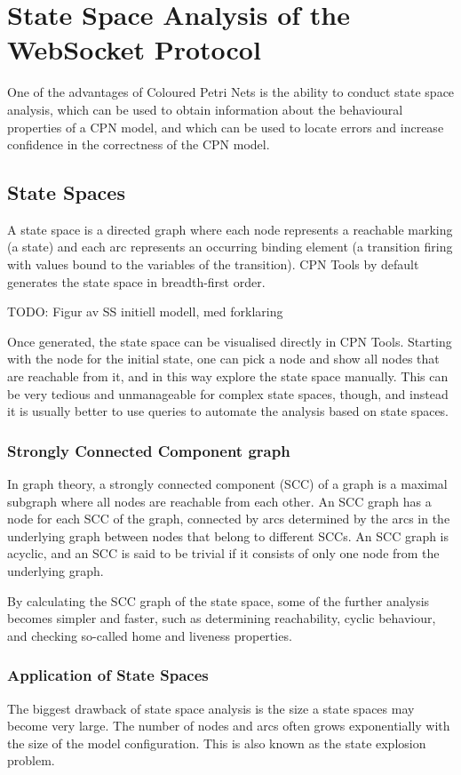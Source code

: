 \chapter{State Space Analysis of the WebSocket Protocol}
\label{chap:statespace}

One of the advantages of Coloured Petri Nets is the ability to conduct state
space analysis, which can be used to obtain information about the
behavioural properties of a CPN model, and which can be used to locate errors
and increase confidence in the correctness of the CPN model.

\section{State Spaces}
A state space is a directed graph where each node represents a reachable marking
(a state) and each arc represents an occurring binding element (a transition
firing with values bound to the variables of the transition). CPN Tools
by default generates the state space in breadth-first order. 

TODO: Figur av SS initiell modell, med forklaring

Once generated, the state space can be visualised directly in CPN Tools.
Starting with the node for the initial state, one can pick a node and show all
nodes that are reachable from it, and in this way explore the state space
manually. This can be very tedious and unmanageable for complex state spaces,
though, and instead it is usually better to use queries to automate the analysis
based on state spaces.

	\subsection{Strongly Connected Component graph}
	In graph theory, a strongly connected component (SCC) of a graph is a maximal
	subgraph where all nodes are reachable from each other. An SCC graph has a node
	for each SCC of the graph, connected by arcs determined by the arcs in the
	underlying graph between nodes that belong to different SCCs. An
	SCC graph is acyclic, and an SCC is said to be trivial if it consists of only
	one node from the underlying graph.
	
	By calculating the SCC graph of the state space, some of the further
	analysis becomes simpler and faster, such as determining reachability,
	cyclic behaviour, and checking so-called home and liveness properties. 

	\subsection{Application of State Spaces}
		The biggest drawback of state space analysis is the size a state spaces may
		become very large. The number of nodes and arcs often grows exponentially
		with the size of the model configuration.
		This is also known as the state explosion problem.
		

